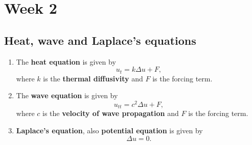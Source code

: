 \chapter{Week 2}
\setcounter{weekpage}{1}
\thispagestyle{plainweek}


\section{Heat, wave and Laplace's equations}

\begin{enumerate}





\item The \textbf{heat equation} is given by
\[ u_{t} = k \Delta u + F,\]
where $k$ is the \textbf{thermal diffusivity} and $F$ is the forcing term.

\vspace{80pt}

\item The \textbf{wave equation} is given by
\[  u_{tt} = c^{2} \Delta u + F,\]
where $c$ is the \textbf{velocity of wave propagation} and $F$ is the forcing term.


\vspace{80pt}


\item \textbf{Laplace's equation}, also \textbf{potential equation} is given by
\[ \Delta u = 0.\]


\vspace{80pt}


\end{enumerate}

